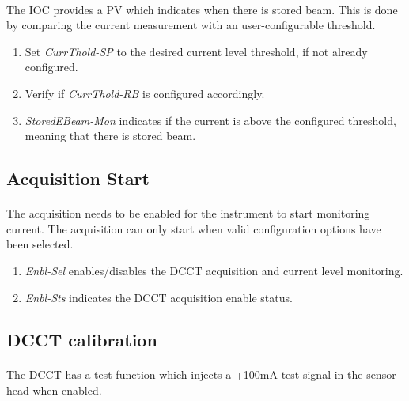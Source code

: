 \documentclass[openany]{article}
\begin{document}
		\paragraph{} The IOC provides a PV which indicates when there is stored beam. This is done by comparing the current measurement with an user-configurable threshold.

		\begin{enumerate}
			\item Set \emph{CurrThold-SP} to the desired current level threshold, if not already configured.
			\item Verify if \emph{CurrThold-RB} is configured accordingly.
			\item \emph{StoredEBeam-Mon} indicates if the current is above the configured threshold, meaning that there is stored beam.
		\end{enumerate}

	\subsection{Acquisition Start}\label{acquisition-start}

		\paragraph{} The acquisition needs to be enabled for the instrument to start monitoring current. The acquisition can only start when valid configuration options have been selected.

	\bigskip
	\noindent{}

			\begin{enumerate}
				\item \emph{Enbl-Sel} enables/disables the DCCT acquisition and current level monitoring.
				\item \emph{Enbl-Sts} indicates the DCCT acquisition enable status.
			\end{enumerate}

	\subsection{DCCT calibration}

		\paragraph{} The DCCT has a test function which injects a +100mA test signal in the sensor head when enabled.
\end{document}
